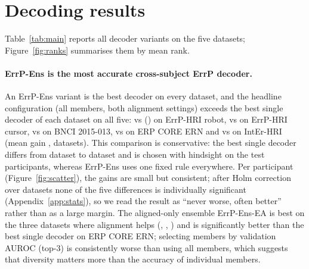 \section{Decoding results}
\label{sec:results}

\begin{table}[t]
\centering
\caption{Cross-subject decoding on ErrP-Bench: macro-participant AUROC on held-out participants (mean $\pm$ SD
over training seeds; $^{\ast}$: one seed). EA: Euclidean alignment (\checkmark), none, or both (ErrP-Ens uses
members of both kinds). Bold: best per dataset. Rank: mean rank over datasets ($^{\dagger}$: not run on every
dataset). All numbers are measured. Pairwise tests in Appendix~\ref{app:stats}.}
\label{tab:main}
\scriptsize
\setlength{\tabcolsep}{3pt}
\resizebox{\linewidth}{!}{}
\end{table}

Table~\ref{tab:main} reports all \NVariantsMax{} decoder variants on the five datasets; Figure~\ref{fig:ranks}
summarises them by mean rank.

\paragraph{ErrP-Ens is the most accurate cross-subject ErrP decoder.} An ErrP-Ens variant is the best decoder
on every dataset, and the headline configuration (all members, both alignment settings) exceeds the best
single decoder of each dataset on all five: \EnsMixErrpHriRobot{} vs \BestSingleErrpHriRobot{}
(\BestSingleModelErrpHriRobot{}) on ErrP-HRI robot, \EnsMixErrpHriCursor{} vs \BestSingleErrpHriCursor{} on
ErrP-HRI cursor, \EnsMixBnci{} vs \BestSingleBnci{} on BNCI 2015-013, \EnsMixErpCoreErn{} vs
\BestSingleErpCoreErn{} on ERP CORE ERN and \EnsMixInterHri{} vs \BestSingleInterHri{} on IntEr-HRI
(mean gain \EnsMixVsBestMean{}, \EnsMixBeatsBest{} datasets). This comparison is conservative: the best single
decoder differs from dataset to dataset and is chosen with hindsight on the test participants, whereas ErrP-Ens
uses one fixed rule everywhere. Per participant (Figure~\ref{fig:scatter}), the gains are small but
consistent; after Holm correction over datasets none of the five differences is individually significant
(Appendix~\ref{app:stats}), so we read the result as ``never worse, often better'' rather than as a large
margin. The aligned-only ensemble ErrP-Ens-EA is best on the three datasets where alignment helps
(\EnsAllErrpHriRobot{}, \EnsAllErrpHriCursor{}, \EnsAllErpCoreErn{}) and is significantly better than the best
single decoder on ERP CORE ERN; selecting members by validation AUROC (top-3) is consistently worse than using
all members, which suggests that diversity matters more than the accuracy of individual members.

